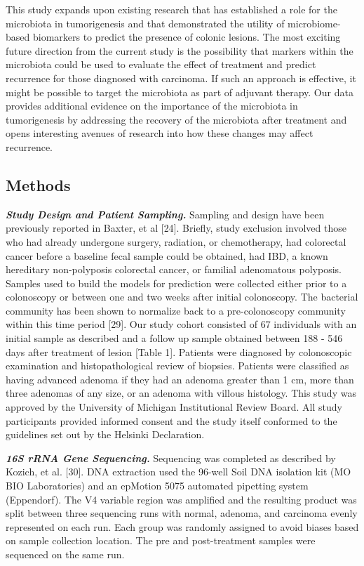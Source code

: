 \documentclass[12pt,]{article}
\begin{document}
This study expands upon existing research that has established a role
for the microbiota in tumorigenesis and that demonstrated the utility of
microbiome-based biomarkers to predict the presence of colonic lesions.
The most exciting future direction from the current study is the
possibility that markers within the microbiota could be used to evaluate
the effect of treatment and predict recurrence for those diagnosed with
carcinoma. If such an approach is effective, it might be possible to
target the microbiota as part of adjuvant therapy. Our data provides
additional evidence on the importance of the microbiota in tumorigenesis
by addressing the recovery of the microbiota after treatment and opens
interesting avenues of research into how these changes may affect
recurrence.

\newpage

\subsection{Methods}\label{methods}

\textbf{\emph{Study Design and Patient Sampling.}} Sampling and design
have been previously reported in Baxter, et al {[}24{]}. Briefly, study
exclusion involved those who had already undergone surgery, radiation,
or chemotherapy, had colorectal cancer before a baseline fecal sample
could be obtained, had IBD, a known hereditary non-polyposis colorectal
cancer, or familial adenomatous polyposis. Samples used to build the
models for prediction were collected either prior to a colonoscopy or
between one and two weeks after initial colonoscopy. The bacterial
community has been shown to normalize back to a pre-colonoscopy
community within this time period {[}29{]}. Our study cohort consisted
of 67 individuals with an initial sample as described and a follow up
sample obtained between 188 - 546 days after treatment of lesion
{[}Table 1{]}. Patients were diagnosed by colonoscopic examination and
histopathological review of biopsies. Patients were classified as having
advanced adenoma if they had an adenoma greater than 1 cm, more than
three adenomas of any size, or an adenoma with villous histology. This
study was approved by the University of Michigan Institutional Review
Board. All study participants provided informed consent and the study
itself conformed to the guidelines set out by the Helsinki Declaration.

\textbf{\emph{16S rRNA Gene Sequencing.}} Sequencing was completed as
described by Kozich, et al. {[}30{]}. DNA extraction used the 96-well
Soil DNA isolation kit (MO BIO Laboratories) and an epMotion 5075
automated pipetting system (Eppendorf). The V4 variable region was
amplified and the resulting product was split between three sequencing
runs with normal, adenoma, and carcinoma evenly represented on each run.
Each group was randomly assigned to avoid biases based on sample
collection location. The pre and post-treatment samples were sequenced
on the same run.
\end{document}
